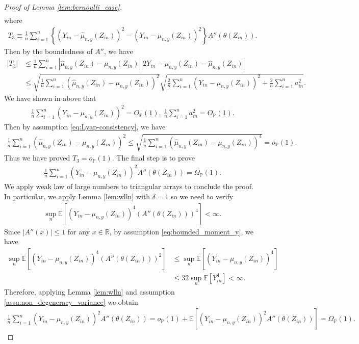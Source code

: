 \documentclass[12pt]{article}
\theoremstyle{definition}
\def\P{\mathbb{P}}
\def\P{\mathbb{P}}
\newcommand{\E}{\mathbb E}								%
\renewcommand{\P}{\mathbb{P}}							%
\newcommand{\srz}{Z}									%
\newcommand{\sry}{Y}									%
\begin{document}
\begin{proof}[Proof of Lemma \ref{lem:bernoulli_case}]
\begin{align*}
	\end{align*}
	where 
	\begin{align*}
		T_3\equiv  \frac{1}{n}\sum_{i=1}^n \left\{(\sry_{in}-\widehat \mu_{n,y}(\srz_{in}))^2-(\sry_{in}- \mu_{n,y}(\srz_{in}))^2\right\}A''(\theta(\srz_{in})).
	\end{align*}
	Then by the boundedness of $A''$, we have 
	\begin{align*}
		|T_3|
		&
		\leq \frac{1}{n}\sum_{i=1}^n|\widehat{\mu}_{n,y}(\srz_{in})-\mu_{n,y}(\srz_{in})||2\sry_{in}-\mu_{n,y}(\srz_{in})-\widehat\mu_{n,y}(\srz_{in})|\\
		&
		\leq \sqrt{\frac{1}{n}\sum_{i=1}^n (\widehat{\mu}_{n,y}(\srz_{in})-\mu_{n,y}(\srz_{in}))^2}\sqrt{\frac{2}{n}\sum_{i=1}^n (\sry_{in}-\mu_{n,y}(\srz_{in}))^2+\frac{2}{n}\sum_{i=1}^n a_{in}^2}.
	\end{align*}
	We have shown in above that 
	\begin{align*}
		\frac{1}{n}\sum_{i=1}^n (\sry_{in}-\mu_{n,y}(\srz_{in}))^2=O_{\P}(1),\ \frac{1}{n}\sum_{i=1}^n a_{in}^2=O_{\P}(1).
	\end{align*}
	Then by assumption \eqref{eq:Lyap-consistency}, we have 
	\begin{align*}
		\frac{1}{n}\sum_{i=1}^n (\widehat{\mu}_{n,y}(\srz_{in})-\mu_{n,y}(\srz_{in}))^2\leq \sqrt{\frac{1}{n}\sum_{i=1}^n (\widehat{\mu}_{n,y}(\srz_{in})-\mu_{n,y}(\srz_{in}))^4}=o_{\P}(1).
	\end{align*}
	Thus we have proved $T_3=o_{\P}(1)$. The final step is to prove 
	\begin{align*}
		\frac{1}{n}\sum_{i=1}^n (\sry_{in}-\mu_{n,y}(\srz_{in}))^2A''(\theta(\srz_{in}))=\Omega_{\P}(1).
	\end{align*}
	We apply weak law of large numbers to triangular arrays to conclude the proof. In particular, we apply Lemma \ref{lem:wlln} with $\delta=1$ so we need to verify 
	\begin{align*}
		\sup_n\E[(\sry_{in}-\mu_{n,y}(\srz_{in}))^4(A''(\theta(\srz_{in})))^4]<\infty.
	\end{align*}
	Since $|A''(x)|\leq 1$ for any $x\in\mathbb{R}$, by assumption \eqref{eq:bounded_moment_y}, we have
	\begin{align*}
		\sup_n\E[(\sry_{in}-\mu_{n,y}(\srz_{in}))^4(A''(\theta(\srz_{in})))^2]
		&
		\leq \sup_n\E[(\sry_{in}-\mu_{n,y}(\srz_{in}))^4]\\
		&
		\leq 32\sup_n\E[\sry_{in}^4]<\infty.
	\end{align*} 
	Therefore, applying Lemma \ref{lem:wlln} and assumption \ref{assu:non_degeneracy_variance} we obtain 
	\begin{align*}
		\frac{1}{n}\sum_{i=1}^n (\sry_{in}-\mu_{n,y}(\srz_{in}))^2A''(\theta(\srz_{in}))=o_{\P}(1)+\E[(\sry_{in}-\mu_{n,y}(\srz_{in}))^2A''(\theta(\srz_{in}))]=\Omega_{\P}(1).
	\end{align*}


\end{proof}
\end{document}
